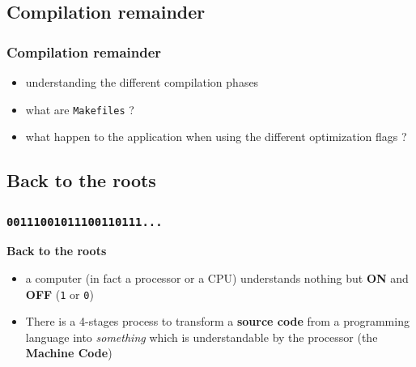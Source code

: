 \subsection{Compilation remainder}

\begin{frame}
\frametitle{Compilation remainder}

\begin{itemize}
	\item understanding the different compilation phases
	\item what are {\tt Makefiles} ?
	\item what happen to the application when using the different optimization flags ? 
\end{itemize}

\end{frame}

\subsection{Back to the roots}

\begin{frame}
\frametitle{{\tt 00111001011100110111...}}

{\bf Back to the roots}

\begin{itemize}
	\item a computer (in fact a processor or a CPU) understands nothing but {\bf ON} and {\bf OFF} ({\tt 1} or {\tt 0})
	\item There is a 4-stages process to transform a {\bf source code} from a programming language into {\it something} which is understandable by the processor (the {\bf Machine Code})
\end{itemize}

\end{frame}


